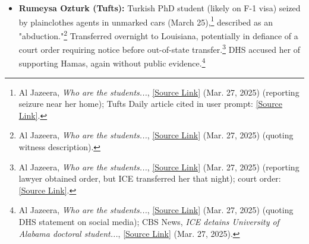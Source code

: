 \documentclass[11pt, letterpaper]{article}
\begin{document}
\begin{itemize}
        \item \textbf{Rumeysa Ozturk (Tufts):} Turkish PhD student (likely on F-1 visa) seized by plainclothes agents in unmarked cars (March 25),\footnote{Al Jazeera, \emph{Who are the students...}, \href{https://www.aljazeera.com/news/2025/3/27/who-are-the-students-trump-wants-to-deport\#:~:text=Security\%20camera\%20footage\%20from\%20Tuesday,to\%20break\%20her\%20Ramadan\%20fast}{[Source Link]} (Mar. 27, 2025) (reporting seizure near her home); Tufts Daily article cited in user prompt: \href{https://www.tuftsdaily.com/article/2024/03/4ftk27sm6jkj}{[Source Link]}.} described as an "abduction."\footnote{Al Jazeera, \emph{Who are the students...}, \href{https://www.aljazeera.com/news/2025/3/27/who-are-the-students-trump-wants-to-deport\#:~:text=match\%20at\%20L186\%20The\%20video,They\%E2\%80\%99re\%20in\%20unmarked}{[Source Link]} (Mar. 27, 2025) (quoting witness description).} Transferred overnight to Louisiana, potentially in defiance of a court order requiring notice before out-of-state transfer.\footnote{Al Jazeera, \emph{Who are the students...}, \href{https://www.aljazeera.com/news/2025/3/27/who-are-the-students-trump-wants-to-deport\#:~:text=Ozturk\%E2\%80\%99s\%20lawyer\%2C\%20Mahsa\%20Khanbabai\%2C\%20filed,Massachusetts\%20without\%2048\%20hours\%20notice}{[Source Link]} (Mar. 27, 2025) (reporting lawyer obtained order, but ICE transferred her that night); court order: \href{https://lnkd.in/eWNae6hZ}{[Source Link]}.} DHS accused her of supporting Hamas, again without public evidence.\footnote{Al Jazeera, \emph{Who are the students...}, \href{https://www.aljazeera.com/news/2025/3/27/who-are-the-students-trump-wants-to-deport\#:~:text=match\%20at\%20L168\%20an\%20X,specify\%20what\%20these\%20activities\%20were}{[Source Link]} (Mar. 27, 2025) (quoting DHS statement on social media); CBS News, \emph{ICE detains University of Alabama doctoral student...}, \href{https://www.cbsnews.com/news/ice-detains-university-of-alabama-doctoral-student/?intcid=CNI-00-10aaa3a\#:~:text=A\%20Tufts\%20University\%20graduate\%20student,details\%20about\%20her\%20alleged\%20activities}{[Source Link]} (Mar. 27, 2025).}

\end{itemize}
\end{document}
